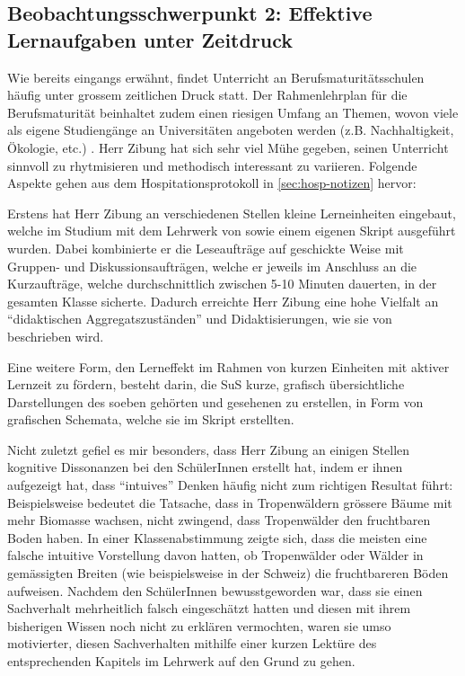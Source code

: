 \subsection{Beobachtungsschwerpunkt 2: Effektive Lernaufgaben unter Zeitdruck}
Wie bereits eingangs erwähnt, findet Unterricht an Berufsmaturitätsschulen häufig unter grossem zeitlichen Druck statt. Der Rahmenlehrplan für die Berufsmaturität beinhaltet zudem einen riesigen Umfang an Themen, wovon viele als eigene Studiengänge an Universitäten angeboten werden (z.B. Nachhaltigkeit, Ökologie, etc.) \cite{sbfi}. Herr Zibung hat sich sehr viel Mühe gegeben, seinen Unterricht sinnvoll zu rhytmisieren und methodisch interessant zu variieren. Folgende Aspekte gehen aus dem Hospitationsprotokoll in \cref{sec:hosp-notizen} hervor:

Erstens hat Herr Zibung an verschiedenen Stellen kleine Lerneinheiten eingebaut, welche im Studium mit dem Lehrwerk von \textcite{compendio} sowie einem eigenen Skript ausgeführt wurden. Dabei kombinierte er die Leseaufträge auf geschickte Weise mit Gruppen- und Diskussionsaufträgen, welche er jeweils im Anschluss an die Kurzaufträge, welche durchschnittlich zwischen 5-10 Minuten dauerten, in der gesamten Klasse sicherte. Dadurch erreichte Herr Zibung eine hohe Vielfalt an \enquote{didaktischen Aggregatszuständen} und Didaktisierungen, wie sie von \textcite{kaiser} beschrieben wird.

Eine weitere Form, den Lerneffekt im Rahmen von kurzen Einheiten mit aktiver Lernzeit zu fördern, besteht darin, die SuS kurze, grafisch übersichtliche Darstellungen des soeben gehörten und gesehenen zu erstellen, in Form von grafischen Schemata, welche sie im Skript erstellten.

Nicht zuletzt gefiel es mir besonders, dass Herr Zibung an einigen Stellen kognitive Dissonanzen bei den SchülerInnen erstellt hat, indem er ihnen aufgezeigt hat, dass \enquote{intuives} Denken häufig nicht zum richtigen Resultat führt: Beispielsweise bedeutet die Tatsache, dass in Tropenwäldern grössere Bäume mit mehr Biomasse wachsen, nicht zwingend, dass Tropenwälder den fruchtbaren Boden haben. In einer Klassenabstimmung zeigte sich, dass die meisten eine falsche intuitive Vorstellung davon hatten, ob Tropenwälder oder Wälder in gemässigten Breiten (wie beispielsweise in der Schweiz) die fruchtbareren Böden aufweisen. Nachdem den SchülerInnen bewusstgeworden war, dass sie einen Sachverhalt mehrheitlich falsch eingeschätzt hatten und diesen mit ihrem bisherigen Wissen noch nicht zu erklären vermochten, waren sie umso motivierter, diesen Sachverhalten mithilfe einer kurzen Lektüre des entsprechenden Kapitels im Lehrwerk auf den Grund zu gehen.

